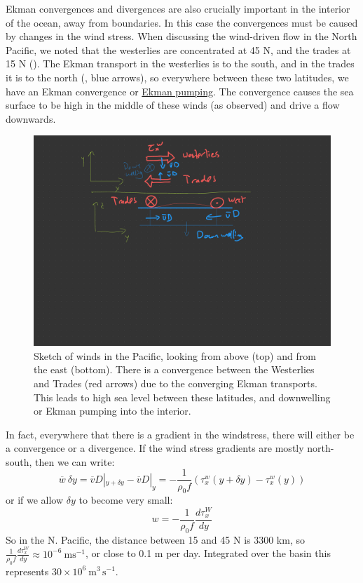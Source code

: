 Ekman convergences and divergences are also crucially important in the interior of the ocean, away from boundaries.  In this case the convergences must be caused by changes in the wind stress. When discussing the wind-driven flow in the North Pacific, we noted that the westerlies are concentrated at 45 N, and the trades at 15 N ().  The Ekman transport in the westerlies is to the south, and in the trades it is to the north (, blue arrows), so everywhere between these two latitudes, we have an Ekman convergence or \href{https://en.wikipedia.org/wiki/Ekman_transport#Ekman_pumping}{Ekman pumping}.  The convergence causes the sea surface to be high in the middle of these winds (as observed) and drive a flow downwards.

\begin{figure}[hbt]
  \begin{center}
    \includegraphics{figs/Coriolis/SketchPacificConv}
    \caption{Sketch of winds in the Pacific, looking from above (top) and from the east (bottom).  There is a convergence between the Westerlies and Trades (red arrows) due to the converging Ekman transports. This leads to high sea level between these latitudes, and downwelling or Ekman pumping into the interior.}
    \label{fig:SketchPacificConv}  
  \end{center}
\end{figure}

In fact, everywhere that there is a gradient in the windstress, there will either be a convergence or a divergence.  If the wind stress gradients are mostly north-south, then we can write:
\begin{equation}
    \overline{w}\ \delta y =  \overline{v}D|_{y+\delta y} - \overline{v}D|_y = - \frac{1}{\rho_0 f}\left(  \tau_x^w(y+\delta y) - \tau_x^w(y) \right)
\end{equation}
or if we allow $\delta y$ to become very small:
\begin{equation}
    w = -\frac{1}{\rho_0 f} \frac{d \tau_x^W}{d y}
\end{equation}
So in the N. Pacific, the distance between 15 and 45 N is 3300 km, so $\frac{1}{\rho_0 f}\frac{d\tau_x^W}{d y} \approx 10^{-6}\ \mathrm{ms^{-1}}$, or close to 0.1 m per day.  Integrated over the basin this represents $30\times10^{6}\ \mathrm{m^3\,s^{-1}}$.  

